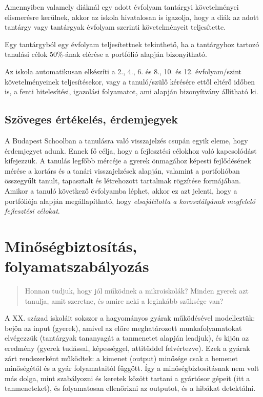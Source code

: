 Amennyiben valamely diáknál egy adott évfolyam tantárgyi követelményei elismerésre kerülnek, akkor az iskola hivatalosan is igazolja, hogy a diák az adott tantárgy vagy tantárgyak évfolyam szerinti követelményeit teljesítette.

Egy tantárgyból egy évfolyam teljesítettnek tekinthető, ha a tantárgyhoz tartozó tanulási célok 50\%-ának elérése a portfólió alapján bizonyítható.

Az iskola automatikusan elkészíti a 2., 4., 6. és 8., 10. és 12. évfolyam/szint követelményeinek teljesítésekor, vagy a tanuló/szülő kérésére ettől eltérő időben is, a fenti hitelesítési, igazolási folyamatot, ami alapján bizonyítvány állítható ki.

\subsection{Szöveges értékelés, érdemjegyek}

A Budapest Schoolban a tanulásra való visszajelzés csupán egyik eleme, hogy érdemjegyet adunk. Ennek fő célja, hogy a fejlesztési célokhoz való kapcsolódást kifejezzük. A tanulás legfőbb mércéje a gyerek önmagához képesti fejlődésének mérése a kortárs és a tanári visszajelzések alapján, valamint a portfolióban összegyűlt tanult, tapasztalt és létrehozott tartalmak rögzítése formájában.  Amikor a tanuló következő évfolyamba léphet, akkor ez azt jelenti, hogy a portfóliója alapján megállapítható, hogy \emph{elsajátította a korosztályának megfelelő fejlesztési célokat}.


\section{Minőségbiztosítás, folyamatszabályozás}
\label{sec:minosegbiztositas}
\begin{quote}
Honnan tudjuk, hogy jól működnek a mikroiskolák? Minden gyerek azt tanulja, amit szeretne, és amire neki a leginkább szüksége van?
\end{quote}

A XX. század iskoláit sokszor a hagyományos gyárak működésével modelleztük: bejön az input (gyerek), amivel az előre meghatározott munkafolyamatokat elvégezzük (tantárgyak tananyagát a tanmenetet alapján leadjuk), és kijön az eredmény (gyerek tudással, képességgel, attitűddel felvértezve). Ezek a gyárak zárt rendszerként működtek: a kimenet (output) minősége csak a bemenet minőségétől és a gyár folyamataitól függött. Így a minőségbiztosításnak nem volt más dolga, mint szabályozni és keretek között tartani a gyártósor gépeit (itt a tanmeneteket), és folyamatosan ellenőrizni az outputot, és a hibákat detektálni.

